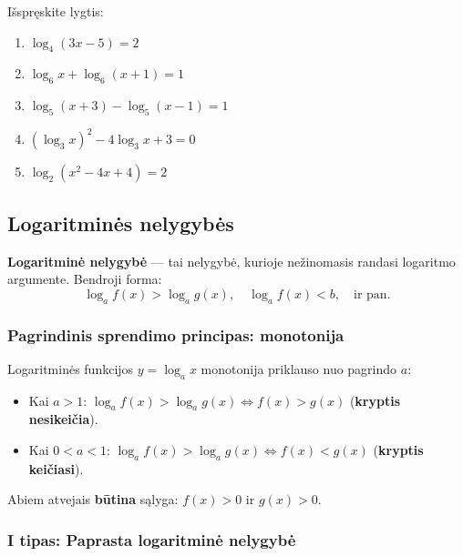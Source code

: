 \begin{exercise}
Išspręskite lygtis:
\begin{enumerate}[label=\alph*)]
    \item \(\log_4(3x - 5) = 2\)
    \item \(\log_6 x + \log_6(x+1) = 1\)
    \item \(\log_5(x+3) - \log_5(x-1) = 1\)
    \item \((\log_3 x)^2 - 4\log_3 x + 3 = 0\)
    \item \(\log_2(x^2 - 4x + 4) = 2\)
\end{enumerate}
\end{exercise}

\subsection{Logaritminės nelygybės}

\begin{definition}
\textbf{Logaritminė nelygybė} — tai nelygybė, kurioje nežinomasis randasi logaritmo argumente. Bendroji forma:
\[
\log_a f(x) > \log_a g(x), \quad \log_a f(x) < b, \quad \text{ir pan.}
\]
\end{definition}

\subsubsection{Pagrindinis sprendimo principas: monotonija}

Logaritminės funkcijos \(y = \log_a x\) monotonija priklauso nuo pagrindo \(a\):

\begin{tcolorbox}[colback=green!5, colframe=green!40, title=\textbf{Nelygybės krypties taisyklė}]
\begin{itemize}
    \item Kai \(a > 1\): \(\log_a f(x) > \log_a g(x) \iff f(x) > g(x)\) \quad (\textbf{kryptis nesikeičia}).
    \item Kai \(0 < a < 1\): \(\log_a f(x) > \log_a g(x) \iff f(x) < g(x)\) \quad (\textbf{kryptis keičiasi}).
\end{itemize}
Abiem atvejais \textbf{būtina} sąlyga: \(f(x) > 0\) ir \(g(x) > 0\).
\end{tcolorbox}

\subsubsection{I tipas: Paprasta logaritminė nelygybė}

